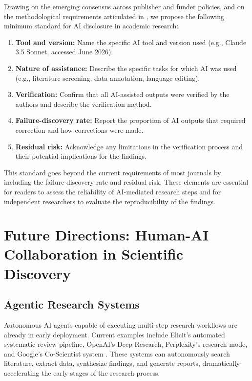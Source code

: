 \documentclass[12pt, a4paper]{article}
\begin{document}
Drawing on the emerging consensus across publisher and funder policies, and on the methodological requirements articulated in \citet{zyphur2026responsible}, we propose the following minimum standard for AI disclosure in academic research:

\begin{tcolorbox}[colback=boxgray, colframe=nupurple, title=Proposed Minimum Standard for AI Disclosure in Academic Research]
\begin{enumerate}
    \item \textbf{Tool and version:} Name the specific AI tool and version used (e.g., Claude 3.5 Sonnet, accessed June 2026).
    \item \textbf{Nature of assistance:} Describe the specific tasks for which AI was used (e.g., literature screening, data annotation, language editing).
    \item \textbf{Verification:} Confirm that all AI-assisted outputs were verified by the authors and describe the verification method.
    \item \textbf{Failure-discovery rate:} Report the proportion of AI outputs that required correction and how corrections were made.
    \item \textbf{Residual risk:} Acknowledge any limitations in the verification process and their potential implications for the findings.
\end{enumerate}
\end{tcolorbox}

This standard goes beyond the current requirements of most journals by including the failure-discovery rate and residual risk. These elements are essential for readers to assess the reliability of AI-mediated research steps and for independent researchers to evaluate the reproducibility of the findings.

\section{Future Directions: Human-AI Collaboration in Scientific Discovery}

\subsection{Agentic Research Systems}

Autonomous AI agents capable of executing multi-step research workflows are already in early deployment. Current examples include Elicit's automated systematic review pipeline, OpenAI's Deep Research, Perplexity's research mode, and Google's Co-Scientist system \citep{gottweis2026coscientist}. These systems can autonomously search literature, extract data, synthesize findings, and generate reports, dramatically accelerating the early stages of the research process.
\end{document}
